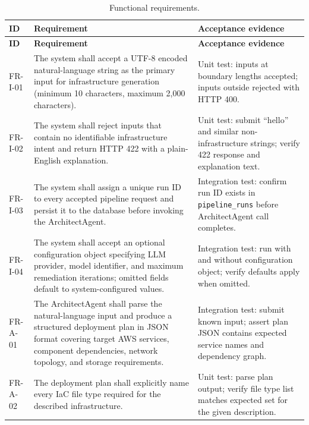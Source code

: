 \begin{longtable}{@{}p{}p{}p{}@{}}
\caption{Functional requirements.}\label{tab:functional-requirements}\\
\toprule
\textbf{ID} & \textbf{Requirement} & \textbf{Acceptance evidence} \\
\midrule
\endfirsthead
\toprule
\textbf{ID} & \textbf{Requirement} & \textbf{Acceptance evidence} \\
\midrule
\endhead

FR-I-01 & The system shall accept a UTF-8 encoded natural-language string as
  the primary input for infrastructure generation (minimum 10 characters,
  maximum 2,000 characters). &
  Unit test: inputs at boundary lengths accepted; inputs outside rejected
  with HTTP 400. \\

FR-I-02 & The system shall reject inputs that contain no identifiable
  infrastructure intent and return HTTP 422 with a plain-English
  explanation. &
  Unit test: submit ``hello'' and similar non-infrastructure strings;
  verify 422 response and explanation text. \\

FR-I-03 & The system shall assign a unique run ID to every accepted pipeline
  request and persist it to the database before invoking the
  ArchitectAgent. &
  Integration test: confirm run ID exists in \texttt{pipeline\_runs}
  before ArchitectAgent call completes. \\

FR-I-04 & The system shall accept an optional configuration object specifying
  LLM provider, model identifier, and maximum remediation iterations;
  omitted fields default to system-configured values. &
  Integration test: run with and without configuration object; verify
  defaults apply when omitted. \\

\midrule

FR-A-01 & The ArchitectAgent shall parse the natural-language input and
  produce a structured deployment plan in JSON format covering target AWS
  services, component dependencies, network topology, and storage
  requirements. &
  Integration test: submit known input; assert plan JSON contains
  expected service names and dependency graph. \\

FR-A-02 & The deployment plan shall explicitly name every IaC file type
  required for the described infrastructure. &
  Unit test: parse plan output; verify file type list matches
  expected set for the given description. \\


\end{longtable}
